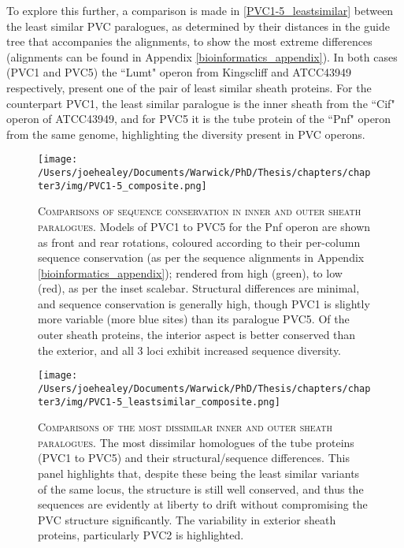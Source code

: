 To explore this further, a comparison is made in \vref{PVC1-5_leastsimilar} between the least similar PVC paralogues, as determined by their distances in the guide tree that accompanies the alignments, to show the most extreme differences (alignments can be found in Appendix \vref{bioinformatics_appendix}). In both cases (PVC1 and PVC5) the ``Lumt" operon from \Pasy{} Kingscliff and ATCC43949 respectively, present one of the pair of least similar sheath proteins. For the counterpart PVC1, the least similar paralogue is the inner sheath from the ``Cif" operon of \Pasy{} ATCC43949, and for PVC5 it is the tube protein of the ``Pnf" operon from the same genome, highlighting the diversity present in PVC operons.

\begin{landscape}
\begin{figure}[p]
 \centering
 \texttt{[image: /Users/joehealey/Documents/Warwick/PhD/Thesis/chapters/chapter3/img/PVC1-5\_composite.png]}
 \captionsetup{singlelinecheck=off, justification=justified, font=footnotesize, aboveskip=10pt}
 \caption[PVC1 to PVC5 paralogue conservation comparison]{\textsc{\normalsize Comparisons of sequence conservation in inner and outer sheath paralogues.}\vspace{0.1cm} \newline Models of PVC1 to PVC5 for the Pnf operon are shown as front and rear rotations, coloured according to their per-column sequence conservation (as per the sequence alignments in Appendix \ref{bioinformatics_appendix}); rendered from high (green), to low (red), as per the inset scalebar. Structural differences are minimal, and sequence conservation is generally high, though PVC1 is slightly more variable (more blue sites) than its paralogue PVC5. Of the outer sheath proteins, the interior aspect is better conserved than the exterior, and all 3 loci exhibit increased sequence diversity.}
	\label{PVC1-5_conservation}
\end{figure}

\begin{figure}[p]
 \centering
  \texttt{[image: /Users/joehealey/Documents/Warwick/PhD/Thesis/chapters/chapter3/img/PVC1-5\_leastsimilar\_composite.png]}
 \captionsetup{singlelinecheck=off, justification=justified, font=footnotesize, aboveskip=10pt}
 \caption[Comparisons of the most dissimilar tube proteins]{\textsc{\normalsize Comparisons of the most dissimilar inner and outer sheath paralogues.}\vspace{0.1cm} \newline The most dissimilar homologues of the tube proteins (PVC1 to PVC5) and their structural/sequence differences. This panel highlights that, despite these being the least similar variants of the same locus, the structure is still well conserved, and thus the sequences are evidently at liberty to drift without compromising the PVC structure significantly. The variability in exterior sheath proteins, particularly PVC2 is highlighted.}
 \label{PVC1-5_leastsimilar}
\end{figure}
\end{landscape}
